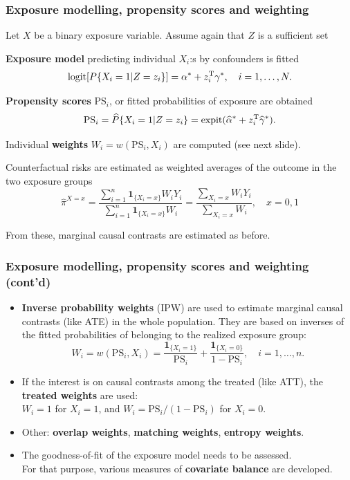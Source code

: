 \documentclass[12pt,dvipsnames,t,aspectratio=169, handout%
]{beamer}
\begin{document}
\begin{frame}
\frametitle{\large Exposure modelling, propensity scores and weighting}
Let $X$ be a binary exposure variable. Assume again that $Z$ is a sufficient set 
\bi
\item
{\bf Exposure model} predicting individual $X_i$:s by confounders is fitted
$$
 \text{logit}[P\{X_i=1|Z=z_i\}] = \alpha^* + z_i^{\small\text{T}}\gamma^*, \quad i=1, \dots, N.
$$ 
\item
{\bf Propensity scores} PS$_i$, or fitted  
probabilities of exposure are obtained
$$ \text{PS}_i = \widehat{P}\{X_i=1|Z=z_i\} = \text{expit}(\widehat\alpha^* + z_i^{\small\text{T}}\widehat\gamma^* ). $$
\item
Individual {\bf weights} $W_i = w(\text{PS}_i, X_i)$ are computed (see next slide).
\medskip
\item
Counterfactual risks are estimated as weighted averages of the outcome in the two exposure groups
$$
 \widehat\pi^{X=x} = \frac{\sum_{i=1}^n {\mathbf 1}_{ \{X_i=x\} } W_i Y_i}{\sum_{i=1}^n {\mathbf 1}_{\{X_i=x\}}W_i } 
 = \frac{\sum_{X_i=x} W_i Y_i}{\sum_{X_i=x} W_i }, \quad x=0,1 
$$
\item
From these, marginal causal contrasts are estimated as before.

\ei

\end{frame}

\begin{frame}
\frametitle{\large Exposure modelling, propensity scores and weighting (cont'd)}

\begin{itemize}
\item
\textbf{Inverse probability weights} (IPW) are used 
to estimate marginal causal contrasts (like ATE) in the
whole population. They are based on inverses of the fitted probabilities of belonging
to the realized exposure group:
$$ W_i = w(\text{PS}_i, X_i) = \frac{ {\mathbf 1}_{ \{X_i=1\} } }{\text{PS}_i} +
                               \frac{ {\mathbf 1}_{ \{X_i=0\} } }{1 - \text{PS}_i},
  \quad i=1, \dots, n .
$$	
\item
If the interest is on causal contrasts {among the treated} (like ATT),
the \textbf{treated weights} are used: \\ $W_i = 1$ for $X_i=1$, and $W_i = \text{PS}_i/(1-\text{PS}_i)$
for $X_i=0$. 
\medskip
\item 
Other: \textbf{overlap weights}, \textbf{matching weights}, \textbf{entropy weights}.
\medskip
\item
The goodness-of-fit of the exposure model needs to be assessed. \\
 For that purpose, various measures of \textbf{covariate balance} are developed.

\end{itemize}

\end{frame}
\end{document}
